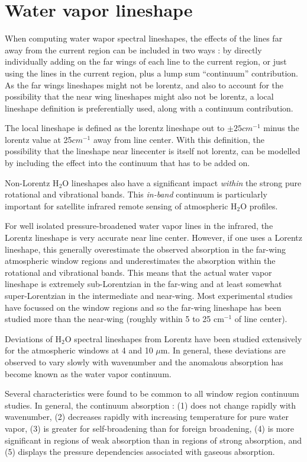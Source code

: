 \documentclass[11pt]{article}
\begin{document}
\section{Water vapor lineshape}\label{sec:local}
When computing water wapor spectral lineshapes, the effects of the lines
far away from the current region can be included in two ways : by directly 
individually adding on the far wings of each line to the current region, or
just using the lines in the current region, plus a lump sum ``continuum'' 
contribution. As the far wings lineshapes might not be lorentz, and also to 
account for the possibility that the near wing lineshapes might also not
be lorentz, a local lineshape definition is preferentially used, along with 
a continuum contribution. 

The local lineshape is defined as the lorentz lineshape out to 
$\pm 25 cm^{-1}$
minus the lorentz value at 25$cm^{-1}$ away from line center. With this 
definition, the possibility that the lineshape near linecenter is itself not
lorentz, can be modelled by including the effect into the continuum that has
to be added on.

Non-Lorentz H$_2$O lineshapes also have a
significant impact {\it within} the strong pure rotational and vibrational
bands.  This {\it in-band} continuum is
particularly important for satellite infrared remote sensing of atmospheric
H$_2$O profiles.  

For well isolated pressure-broadened water vapor lines in the infrared, the
Lorentz lineshape is very accurate near line center.  However, if one uses
a Lorentz lineshape, this generally overestimate the observed 
absorption in the far-wing atmospheric window regions and underestimates the
absorption within the rotational and vibrational bands. This means that 
the actual water vapor lineshape is extremely sub-Lorentzian in the 
far-wing and at least somewhat super-Lorentzian in the intermediate
and near-wing.  Most experimental studies have focussed on the window 
regions and so the far-wing lineshape has been studied more than 
the near-wing (roughly within 5 to 25 cm$^{-1}$ of line center).

Deviations of H$_2$O spectral lineshapes from Lorentz have been studied
extensively for the atmospheric windows at 4 and 10 $\mu$m.  In general,
these deviations are observed to vary slowly with wavenumber and the 
anomalous absorption has become known as the water vapor continuum.  

Several characteristics were found to be common to all window region 
continuum studies.  In general, the continuum absorption 
\cite[for example]{bur:81,gra:90}: (1) does not change rapidly
with wavenumber, (2) decreases rapidly with increasing temperature for
pure water vapor, (3) is greater for self-broadening than for foreign
broadening, (4) is more significant in regions of weak absorption
than in regions of strong absorption, and (5) displays the pressure
dependencies associated with gaseous absorption.
\end{document}
